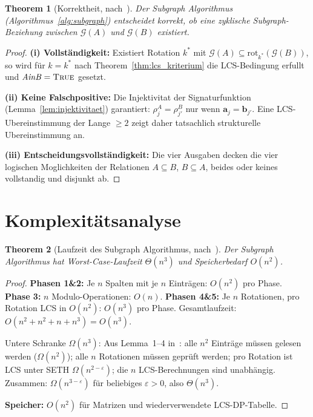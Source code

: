 ﻿\documentclass[12pt, a4paper, titlepage]{report}
\newtheorem{theorem}{Theorem}[section]
\theoremstyle{definition}
\theoremstyle{remark}
\begin{document}
\begin{theorem}[Korrektheit, nach~\citep{epp2026subgraph}]
\label{thm:korrektheit_subgraph}
Der Subgraph Algorithmus (Algorithmus~\ref{alg:subgraph}) entscheidet korrekt,
ob eine zyklische Subgraph-Beziehung zwischen $\mathcal{G}(A)$ und $\mathcal{G}(B)$ existiert.
\end{theorem}

\begin{proof}
\textbf{(i) Vollständigkeit:} Existiert Rotation $k^*$ mit
$\mathcal{G}(A) \subseteq \mathrm{rot}_{k^*}(\mathcal{G}(B))$, so wird für $k=k^*$
nach Theorem~\ref{thm:lcs_kriterium} die LCS-Bedingung erfullt und
$\mathit{AinB}=\textsc{True}$ gesetzt.

\textbf{(ii) Keine Falschpositive:} Die Injektivitat der Signaturfunktion
(Lemma~\ref{lem:injektivitaet}) garantiert: $\rho_j^A = \rho_{j'}^B$ nur wenn
$\bm{a}_j = \bm{b}_{j'}$. Eine LCS-Ubereinstimmung der Lange $\geq 2$ zeigt daher
tatsachlich strukturelle Ubereinstimmung an.

\textbf{(iii) Entscheidungsvollständigkeit:} Die vier Ausgaben decken die vier
logischen Moglichkeiten der Relationen $A \subseteq B$, $B \subseteq A$, beides
oder keines vollstandig und disjunkt ab.
\end{proof}

\section{Komplexitätsanalyse}

\begin{theorem}[Laufzeit des Subgraph Algorithmus, nach~\citep{epp2026subgraph}]
\label{thm:laufzeit_subgraph}
Der Subgraph Algorithmus hat Worst-Case-Laufzeit $\Theta(n^3)$ und
Speicherbedarf $O(n^2)$.
\end{theorem}

\begin{proof}
\textbf{Phasen 1\&2:} Je $n$ Spalten mit je $n$ Einträgen: $O(n^2)$ pro Phase.
\textbf{Phase 3:} $n$ Modulo-Operationen: $O(n)$.
\textbf{Phasen 4\&5:} Je $n$ Rotationen, pro Rotation LCS in $O(n^2)$: $O(n^3)$
pro Phase. Gesamtlaufzeit: $O(n^2+n^2+n+n^3) = O(n^3)$.

Untere Schranke $\Omega(n^3)$: Aus Lemma~1--4 in~\citep{epp2026subgraph}:
alle $n^2$ Einträge müssen gelesen werden ($\Omega(n^2)$); alle $n$ Rotationen
müssen geprüft werden; pro Rotation ist LCS unter SETH $\Omega(n^{2-\varepsilon})$;
die $n$ LCS-Berechnungen sind unabhängig. Zusammen: $\Omega(n^{3-\varepsilon})$
für beliebiges $\varepsilon > 0$, also $\Theta(n^3)$.

\textbf{Speicher:} $O(n^2)$ für Matrizen und wiederverwendete LCS-DP-Tabelle.
\end{proof}
\end{document}
